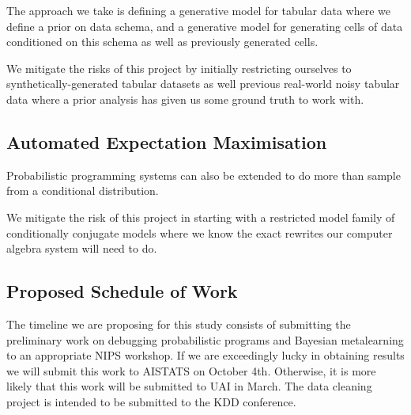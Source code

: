 \documentclass[12pt]{article}
\theoremstyle{definition}
\begin{document}
The approach we take is defining a generative model for tabular data
where we define a prior on data schema, and a generative model for
generating cells of data conditioned on this schema as well as
previously generated cells.

We mitigate the risks of this project by initially restricting
ourselves to synthetically-generated tabular datasets as well previous
real-world noisy tabular data where a prior analysis has given us some
ground truth to work with.


\subsection{Automated Expectation Maximisation}

Probabilistic programming systems can also be extended to do more than
sample from a conditional distribution.

We mitigate the risk of this project in starting with a restricted
model family of conditionally conjugate models where we know the
exact rewrites our computer algebra system will need to do.

\subsection{Proposed Schedule of Work}

The timeline we are proposing for this study consists of submitting
the preliminary work on debugging probabilistic programs and Bayesian
metalearning to an appropriate NIPS workshop. If we are exceedingly
lucky in obtaining results we will submit this work to AISTATS on
October 4th. Otherwise, it is more likely that this work will be
submitted to UAI in March. The data cleaning project is intended to be
submitted to the KDD conference.
\end{document}
